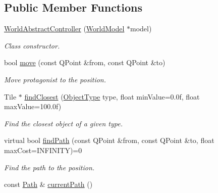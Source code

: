 \subsection*{Public Member Functions}
\begin{DoxyCompactItemize}
\item 
\hyperlink{classWorldAbstractController_a8f4be5436078c93733197d76809df45c}{World\+Abstract\+Controller} (\hyperlink{classWorldModel}{World\+Model} $\ast$model)
\begin{DoxyCompactList}\small\item\em Class constructor. \end{DoxyCompactList}\item 
bool \hyperlink{classWorldAbstractController_a6fdee5689b6fd4b2e8f69d26c0181840}{move} (const Q\+Point \&from, const Q\+Point \&to)
\begin{DoxyCompactList}\small\item\em Move protagonist to the position. \end{DoxyCompactList}\item 
Tile $\ast$ \hyperlink{classWorldAbstractController_ac5789c244d880519632c14c073773389}{find\+Closest} (\hyperlink{worldabstractcontroller_8h_a842c5e2e69277690b064bf363c017980}{Object\+Type} type, float min\+Value=0.\+0f, float max\+Value=100.\+0f)
\begin{DoxyCompactList}\small\item\em Find the closest object of a given type. \end{DoxyCompactList}\item 
virtual bool \hyperlink{classWorldAbstractController_a7716b59b6e3cbd086485e7012ae7d4f0}{find\+Path} (const Q\+Point \&from, const Q\+Point \&to, float max\+Cost=I\+N\+F\+I\+N\+I\+TY)=0
\begin{DoxyCompactList}\small\item\em Find the path to the position. \end{DoxyCompactList}\item 
const \hyperlink{structPath}{Path} \& \hyperlink{classWorldAbstractController_ad3c7531df375e1a5b97e0532acb9c28e}{current\+Path} ()\hypertarget{classWorldAbstractController_ad3c7531df375e1a5b97e0532acb9c28e}{}\label{classWorldAbstractController_ad3c7531df375e1a5b97e0532acb9c28e}


\end{DoxyCompactItemize}
